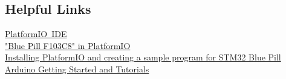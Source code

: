 \documentclass[11pt, oneside]{scrartcl}   	%
\begin{document}
\subsection{Helpful Links}
\href{https://platformio.org/platformio-ide}{PlatformIO IDE}\\
\href{https://docs.platformio.org/en/latest//boards/ststm32/bluepill_f103c8.html}{"Blue Pill F103C8" in PlatformIO}\\
\href{https://www.youtube.com/watch?v=cmHQxd_qGl8}{Installing PlatformIO and creating a sample program for STM32 Blue Pill}\\
\href{https://www.arduino.cc/en/Tutorial/HomePage}{Arduino Getting Started and Tutorials}
\end{document}
